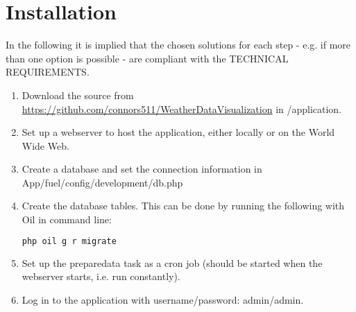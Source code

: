 \chapter{Installation}

In the following it is implied that the chosen solutions for each step - e.g. if more than one option is possible - are compliant with the TECHNICAL REQUIREMENTS.

\begin{enumerate}
\item Download the source from \url{https://github.com/connors511/WeatherDataVisualization} in \textsf{/application}.
\item Set up a webserver to host the application, either locally or on the World Wide Web.
\item Create a database and set the connection information in \textsf{App/fuel/config/development/db.php}
\item Create the database tables. This can be done by running the following with \textsf{Oil} in command line:
\begin{lstlisting}[language=sh]
php oil g r migrate
\end{lstlisting}
\item Set up the \textsf{preparedata} task as a cron job (should be started when the webserver starts, i.e. run constantly).
\item Log in to the application with username/password: \textsf{admin/admin}.
\end{enumerate}
